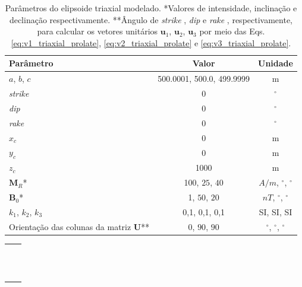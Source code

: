 \begin{table}[h!]
	\begin{center}
		\begin{tabular}{|l|c|c|}
			\hline
			\textbf{Parâmetro}  & \textbf{Valor}  & \textbf{Unidade}\\
			\hline 
			$a$, $b$, $c$   & 500.0001, 500.0, 499.9999   & m\\
			\hline
			\textit{strike}   & $0$ & $^{\circ}$\\
			\hline
			\textit{dip}    & $0$ & $^{\circ}$\\
			\hline
			\textit{rake}   & $0$  & $^{\circ}$\\
			\hline
			$x_c $   & 0  & m\\
			\hline          
			$y_c $   & 0  & m\\
			\hline                
			$z_c $   & 1000  & m\\
			\hline
			$\mathbf{M}_{R}$*  & 100, $25$, $40$  & $A/m$, $^{\circ}$, $^{\circ}$\\
			\hline
			$\mathbf{B}_{0}$*    & 1, $50$, $20$ & $nT$, $^{\circ}$, $^{\circ}$\\
			\hline
			$k_{1}$, $k_{2}$, $k_{3}$   & 0,1, 0,1, 0,1 & SI, SI, SI \\
			\hline
			Orientação das colunas da matriz $\mathbf{U}$**   & $0$, $90$, $90$  & $^{\circ}$, $^{\circ}$, $^{\circ}$\\
			\hline
		\end{tabular}
		\caption{Parâmetros do elipsoide triaxial modelado. *Valores de intensidade, inclinação e declinação respectivamente. **Ângulo de \textit{strike} , \textit{dip}  e \textit{rake} , respectivamente, para calcular os vetores unitários $\mathbf{u}_{1}$, $\mathbf{u}_{2}$, $\mathbf{u}_{3}$ por meio das Eqs. \ref{eq:v1_triaxial_prolate}, \ref{eq:v2_triaxial_prolate} e \ref{eq:v3_triaxial_prolate}.}
	\end{center}
	\label{tab:triaxial_sphere}
\end{table}

\begin{table}[h!]
	\begin{center}
		\begin{tabular}{lc}
			
			&  \\
			& \\
			& \\
			& \\
			& \\
			& \\
			& \\
			& \\
			& \\
			& \\
			& \\
			& \\
				
		\end{tabular}
	\end{center}
\end{table}

